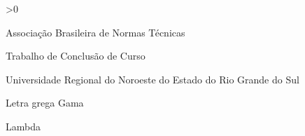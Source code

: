 \documentclass[
    12pt,               %
    oneside,            %
    a4paper,            %
    chapter=TITLE,      %
    section=TITLE,      %
    english,            %
    brazil              %
]{abntex2}
\begin{document}
\ifnum{}>0
    \listoftables*
    \cleardoublepage
\fi

\begin{siglas}
    \item[ABNT] Associação Brasileira de Normas Técnicas
    \item[TCC] Trabalho de Conclusão de Curso
    \item[UNIJUÍ] Universidade Regional do Noroeste do Estado do Rio Grande do Sul
\end{siglas}

\begin{simbolos}
    \item[$ \Gamma $] Letra grega Gama
    \item[$ \Lambda $] Lambda
\end{simbolos}

\tableofcontents*
\cleardoublepage

\textual








\postextual



\begin{apendicesenv}

    
\end{apendicesenv}

\begin{anexosenv}

    
\end{anexosenv}

\end{document}
